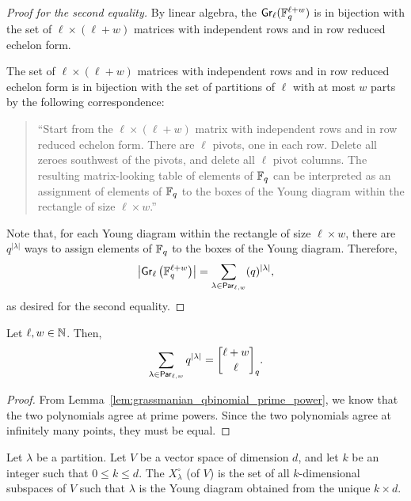 \begin{proof}[Proof for the second equality]
    By linear algebra, the \(\operatorname{\mathsf{Gr}}_\ell(\mathbb{F}_{q}^{\ell + w})\) is in bijection with the set of \(\ell \times (\ell + w)\) matrices with independent rows and in row reduced echelon form.

    The set of \(\ell \times (\ell + w)\) matrices with independent rows and in row reduced echelon form is in bijection with the set of partitions of \(\ell\) with at most \(w\) parts by the following correspondence:
    \begin{quote}
        ``Start from the \(\ell \times (\ell + w)\) matrix with independent rows and in row reduced echelon form.
        There are \(\ell\) pivots, one in each row.
        Delete all zeroes southwest of the pivots, and delete all \(\ell\) pivot columns.
        The resulting matrix-looking table of elements of \(\mathbb{F}_{q}\) can be interpreted as an assignment of elements of \(\mathbb{F}_{q}\) to the boxes of the Young diagram within the rectangle of size \(\ell \times w\).''
    \end{quote}

    Note that, for each Young diagram within the rectangle of size \(\ell \times w\), there are \(q^{|\lambda|}\) ways to assign elements of \(\mathbb{F}_{q}\) to the boxes of the Young diagram.
    Therefore,
    \begin{equation}
        \left|
            \operatorname{\mathsf{Gr}}_\ell\left(\mathbb{F}_{q}^{\ell + w} \right)
        \right|
        = \sum_{\lambda \in \operatorname{\mathsf{Par}}_{\ell, w}} (q)^{|\lambda|},
    \end{equation}
    as desired for the second equality.
\end{proof}

\begin{theorem}
    Let \(\ell, w \in \mathbb{N}\).
    Then,
    \begin{equation}
        \sum_{\lambda \in \Par_{\ell, w}} q^{|\lambda|}
        = \qbinom{\ell + w}{\ell}.
    \end{equation}
\end{theorem}

\begin{proof}
    From Lemma~\ref{lem:grassmanian_qbinomial_prime_power},
    we know that the two polynomials agree at prime powers.
    Since the two polynomials agree at infinitely many points,
    they must be equal.
\end{proof}

\begin{definition}
    Let \(\lambda\) be a partition.
    Let \(V\) be a vector space of dimension \(d\), and let \(k\) be an integer such that \(0 \leq k \leq d\).
    The  \(X^\circ_\lambda\) (of \(V\)) is the set of all \(k\)-dimensional subspaces of \(V\) such that \(\lambda\) is the Young diagram obtained from the unique \(k \times d\).
\end{definition}